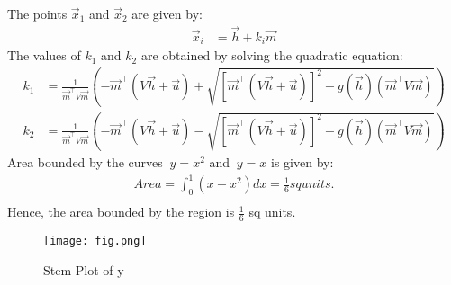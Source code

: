 \documentclass[journal]{IEEEtran}
\begin{document}
The points \( \vec{x}_1 \) and \( \vec{x}_2 \) are given by:
\begin{align}
    \vec{x}_i &= \vec{h} + k_i \vec{m}
\end{align}
The values of \( k_1 \) and \( k_2 \) are obtained by solving the quadratic equation:
\begin{align}
    k_1 &= \frac{1}{\vec{m}^\top V \vec{m}} \left( -\vec{m}^\top (V \vec{h} + \vec{u}) + \sqrt{ \left[ \vec{m}^\top (V \vec{h} + \vec{u}) \right]^2 - g(\vec{h})(\vec{m}^\top V \vec{m})} \right) \\
    k_2 &= \frac{1}{\vec{m}^\top V \vec{m}} \left( -\vec{m}^\top (V \vec{h} + \vec{u}) - \sqrt{ \left[ \vec{m}^\top (V \vec{h} + \vec{u}) \right]^2 - g(\vec{h})(\vec{m}^\top V \vec{m})} \right)
\end{align}
Area bounded by the curves $\ y = x^2 $ and $\ y = x $ is given by:
\begin{align}
Area = \int_0^1 (x - x^2) dx = \frac{1}{6} sq units.\\
\end{align}
Hence, the area bounded by the region is  $\frac{1}{6}$ sq units.\\
\begin{figure}
    \centering
    \texttt{[image: fig.png]}
    \caption{Stem Plot of y}
    \label{fig}
\end{figure}
\end{document}
